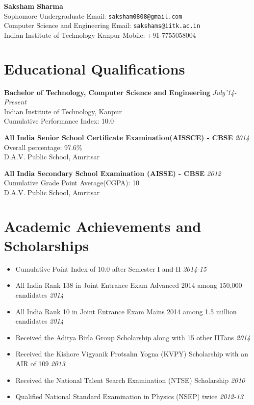 \documentclass[11pt,a4paper]{article}
\begin{document}
\textbf{\huge{Saksham Sharma}}\\	%
Sophomore Undergraduate    \hfill Email: \texttt{saksham0808@gmail.com}\\
Computer Science and Engineering      \hfill  Email: \texttt{sakshams@iitk.ac.in}\\
Indian Institute of Technology Kanpur	\hfill Mobile: {+91-7755058004}

\section*{Educational Qualifications}
\textbf{\large{Bachelor of Technology, Computer Science and Engineering}} \hfill\textit{ July'14-Present}\\
Indian Institute of Technology, Kanpur\\
Cumulative Performance Index: 10.0
\vspace{0.2cm}

\textbf{\large{All India Senior School Certificate Examination(AISSCE) - CBSE}} \hfill\textit{ 2014}\\
Overall percentage: 97.6\%\\
D.A.V. Public School, Amritsar
\vspace{0.2cm}

\textbf{\large{All India Secondary School Examination (AISSE) - CBSE}} \hfill\textit{ 2012}\\
Cumulative Grade Point Average(CGPA): 10\\
D.A.V. Public School, Amritsar


\section*{Academic Achievements and Scholarships}
\begin {itemize}
\item Cumulative Point Index of 10.0 after Semester I and II                                        \hfill \textit{2014-15}
\item All India Rank 138 in Joint Entrance Exam Advanced 2014 among 150,000 candidates            	\hfill \textit{2014}
\item All India Rank 10 in Joint Entrance Exam Mains 2014 among 1.5 million candidates              \hfill \textit{2014}
\item Received the Aditya Birla Group Scholarship along with 15 other IITans                        \hfill \textit{2014}
\item Received the Kishore Vigyanik Protsahn Yogna (KVPY) Scholarship with an AIR of 109            \hfill \textit{2013}
\item Received the National Talent Search Examination (NTSE) Scholarship                            \hfill \textit{2010}
\item Qualified National Standard Examination in Physics (NSEP) twice                               \hfill \textit{2012-13}
\end{itemize}
\end{document}
